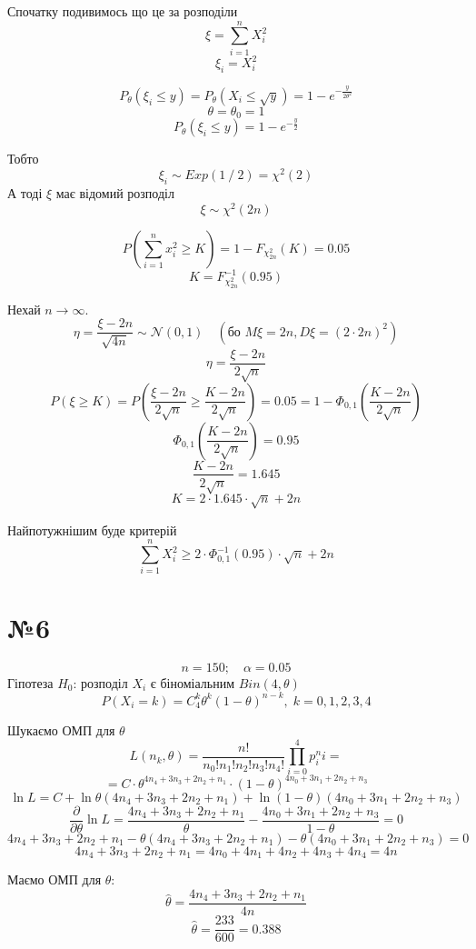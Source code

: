\documentclass[11pt, a4paper]{article} %
\begin{document}
Спочатку подивимось що це за розподіли
$$\xi = \sum_{i=1}^n X_i^2$$
$$\xi_i = X_i^2$$

$$P_\theta(\xi_i \le y) = P_\theta(X_i \le \sqrt{y}) = 1 - e^{-\frac{y}{2\theta^2}}$$
$$\theta = \theta_0 = 1$$
$$P_\theta(\xi_i \le y) = 1 - e^{-\frac{y}{2}}$$

Тобто
$$\xi_i \sim Exp(1\fracslash 2) = \chi^2(2)$$
А тоді $\xi$ має відомий розподіл
$$\xi \sim \chi^2(2n)$$

$$P(\sum_{i=1}^n x_i^2 \ge K) = 1 - F_{\chi^2_{2n}}(K) = 0.05$$
$$K = F^{-1}_{\chi^2_{2n}}(0.95)$$

Нехай $n\to \infty$.
$$\eta = \frac{\xi - 2n}{\sqrt{4n}} \sim \mathcal N(0,1)\quad (\text{бо } M\xi = 2n, D\xi = (2\cdot 2n)^2)$$
$$\eta = \frac{\xi-2n}{2\sqrt{n}}$$
$$P(\xi \ge K) = P(\frac{\xi-2n}{2\sqrt{n}} \ge \frac{K-2n}{2\sqrt{n}} ) = 0.05 = 1 - \Phi_{0,1}(\frac{K-2n}{2\sqrt{n}})$$
$$\Phi_{0,1}(\frac{K-2n}{2\sqrt{n}}) = 0.95$$
$$\frac{K-2n}{2\sqrt{n}} = 1.645$$
$$K = 2 \cdot 1.645 \cdot \sqrt{n} + 2n$$

\begin{mdframed}[style=ans]
    Найпотужнішим буде критерій
    $$\sum_{i=1}^n X_i^2 \ge 2 \cdot \Phi_{0,1}^{-1}(0.95) \cdot \sqrt{n} + 2n$$
\end{mdframed}

\pagebreak

\section*{№6}

\begin{mdframed}
    $$n=150; \quad \alpha = 0.05$$
    Гіпотеза $H_0$: розподіл $X_i$ є біноміальним $Bin(4,\theta)$
    $$P(X_i = k) = C_4^k \theta^k (1-\theta)^{n-k}, \; k=0,1,2,3,4$$ 
\end{mdframed}

Шукаємо ОМП для $\theta$
$$L(n_k, \theta) = \frac{n!}{n_0!n_1!n_2!n_3!n_4!} \prod_{i=0}^4 p_i^ni = $$
$$= C \cdot \theta^{4n_4 + 3n_3 + 2n_2 + n_1} \cdot (1-\theta)^{4n_0 + 3n_1 + 2n_2 + n_3}$$
$$\ln L = C + \ln \theta (4n_4 + 3n_3 + 2n_2 + n_1) + \ln (1-\theta) (4n_0 + 3n_1 + 2n_2 + n_3)$$
$$\frac{\partial}{\partial \theta} \ln L = \frac{4n_4 + 3n_3 + 2n_2 + n_1}{\theta} - \frac{4n_0 + 3n_1 + 2n_2 + n_3}{1-\theta} = 0$$
$$4n_4 + 3n_3 + 2n_2 + n_1 - \theta(4n_4 + 3n_3 + 2n_2 + n_1) - \theta(4n_0 + 3n_1 + 2n_2 + n_3) = 0$$
$$4n_4 + 3n_3 + 2n_2 + n_1 = 4n_0 + 4n_1 + 4n_2 + 4n_3 + 4n_4 = 4n$$

Маємо ОМП для $\theta$:
$$\hat \theta = \frac{4n_4 + 3n_3 + 2n_2 + n_1}{4n}$$
$$\hat \theta = \frac{233}{600} = 0.388$$
\end{document}

